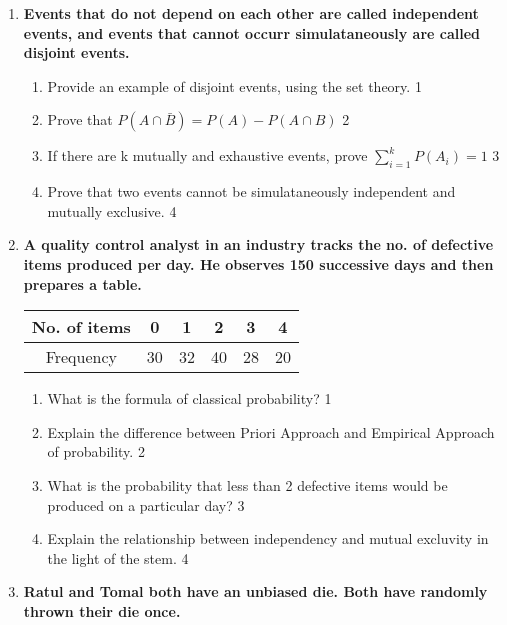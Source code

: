 \documentclass[a4paper,oneside, margin=1.4in]{book}
\begin{document}
\begin{enumerate}

     \item
	  \textbf{Events that do not depend on each other are called independent 
	  events, and events that cannot occurr simulataneously are called disjoint events.} 
  
  \begin{enumerate}
    \item
	Provide an example of disjoint events, using the set theory. \hfill 1
    \item
	Prove that $P(A\cap \bar B) = P(A) - P(A\cap B)$ \hfill 2
    \item  
	If there are k mutually and exhaustive events, prove 
	$\displaystyle \sum_{i=1}^k P(A_i) = 1$ \hfill 3
    \item
	Prove that two events cannot be simulataneously independent and mutually 
	exclusive. \hfill 4
  \end{enumerate}

 \item
	  \textbf{A quality control analyst in an industry tracks the no. 
	  of defective items produced per day. He observes 150 successive days 
	  and then prepares a table.} 
	  
	  \begin{table}[h]
	  \centering
\begin{tabular}{c|c|c|c|c|c} \hline
No. of items & 0 & 1 & 2 & 3 & 4 \\ \hline
Frequency & 30 & 32 & 40 & 28 & 20 \\ \hline
\end{tabular}
\end{table}
  
  \begin{enumerate}
    \item
	What is the formula of classical probability? \hfill 1
    \item
	Explain the difference between Priori Approach and Empirical Approach 
	of probability. \hfill 2
    \item  
	What is the probability that less than 2 defective items would be produced 
	on a particular day? \hfill 3
    \item
	Explain the relationship between independency and mutual excluvity in the 
	light of the stem. \hfill 4
  \end{enumerate}
  
     \item
	  \textbf{Ratul and Tomal both have an unbiased die. Both have randomly thrown
	  their die once. } 
  

\end{enumerate}
\end{document}

